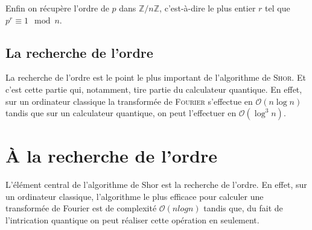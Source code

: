 \documentclass[a4paper,11pt]{tipe}
\newcommand{\Z}{\ensuremath{\mathbb{Z}}}
\renewcommand{\O}{\ensuremath{\mathcal{O}}}
\newcommand{\ZnZ}[1]{\ensuremath{\Z\slash #1\Z}}
{
  \theoremstyle{plain}
  \theoremseparator{.}
  \theoremprework{\medskip\hrule\medskip}
  \theorempostwork{\hrule\bigskip}
  \theorembodyfont{\sffamily}
  \newtheorem*{definition}{Définition}
  \theoremprework{\medskip\hrule\medskip}
  \theorempostwork{\hrule\bigskip}
  \newtheorem*{propriete}{Propriété}
}
{
  \theorembodyfont{\normalfont}
  \theoremsymbol{\ensuremath{\diamondsuit}}
  \newtheorem*{demonstration}{Démonstration}
}
\begin{document}
Enfin on récupère l'ordre de $p$ dans $\ZnZ n$, c'est-à-dire le plus entier $r$
tel que $p ^ r \equiv 1 \mod n$.



\section{La recherche de l'ordre}
La recherche de l'ordre est le point le plus important de l'algorithme de
\textsc{Shor}. Et c'est cette partie qui, notamment, tire partie du calculateur
quantique. En effet, sur un ordinateur classique la transformée de
\textsc{Fourier} s'effectue en $\O(n\log n)$ tandis que sur un calculateur
quantique, on peut l'effectuer en $\O(\log ^ 3 n)$.


\chapter{À la recherche de l'ordre}
L'élément central de l'algorithme de Shor est la recherche de l'ordre. En
effet, sur un ordinateur classique, l'algorithme le plus efficace pour calculer
une transformée de Fourier est de complexité $\O(n log n)$ tandis que, du fait
de l'intrication quantique on peut réaliser cette opération en seulement.
\end{document}
